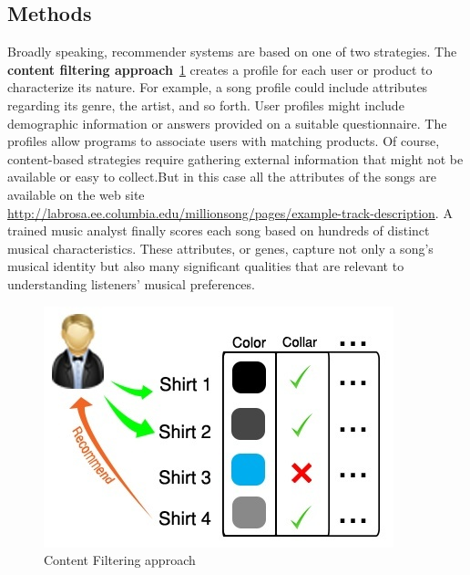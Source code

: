 \documentclass{article}
\begin{document}
\subsection{Methods}
Broadly speaking, recommender systems are based on one of two strategies. The \textbf{content filtering approach}~\ref{fig:content_filtering} creates a profile for each user or product to characterize its nature. For example, a song profile could include attributes regarding its genre, the artist, and so forth. User profiles might include demographic information or answers provided on a suitable questionnaire. The profiles allow programs to associate users with matching products. Of course, content-based strategies require gathering external information that might not be available or easy to collect.But in this case all the attributes of the songs are available on the web site \url{http://labrosa.ee.columbia.edu/millionsong/pages/example-track-description}. A trained music analyst finally scores each song based on hundreds of distinct musical characteristics. These attributes, or genes, capture not only a song’s musical identity but also many significant qualities that are relevant to understanding listeners’ musical preferences.

\begin{figure}[ht]
\vskip 0.2in
\begin{center}
\centerline{\includegraphics[width=\columnwidth]{content_based}}
\caption{Content Filtering approach}
\label{fig:content_filtering}
\end{center}
\vskip -0.2in
\end{figure}
\end{document}
